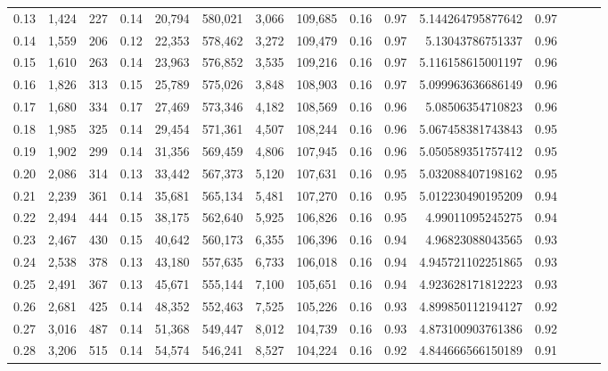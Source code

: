 \begin{tabular}{rrrrrrrrrrrrrrr}
0.13 &   1,424 &    227 &  0.14 &   20,794 &  580,021 &    3,066 &  109,685 &  0.16 &  0.97 &     5.144264795877642 &      0.97 \\
0.14 &   1,559 &    206 &  0.12 &   22,353 &  578,462 &    3,272 &  109,479 &  0.16 &  0.97 &      5.13043786751337 &      0.96 \\
0.15 &   1,610 &    263 &  0.14 &   23,963 &  576,852 &    3,535 &  109,216 &  0.16 &  0.97 &     5.116158615001197 &      0.96 \\
0.16 &   1,826 &    313 &  0.15 &   25,789 &  575,026 &    3,848 &  108,903 &  0.16 &  0.97 &     5.099963636686149 &      0.96 \\
0.17 &   1,680 &    334 &  0.17 &   27,469 &  573,346 &    4,182 &  108,569 &  0.16 &  0.96 &      5.08506354710823 &      0.96 \\
0.18 &   1,985 &    325 &  0.14 &   29,454 &  571,361 &    4,507 &  108,244 &  0.16 &  0.96 &     5.067458381743843 &      0.95 \\
0.19 &   1,902 &    299 &  0.14 &   31,356 &  569,459 &    4,806 &  107,945 &  0.16 &  0.96 &     5.050589351757412 &      0.95 \\
0.20 &   2,086 &    314 &  0.13 &   33,442 &  567,373 &    5,120 &  107,631 &  0.16 &  0.95 &     5.032088407198162 &      0.95 \\
0.21 &   2,239 &    361 &  0.14 &   35,681 &  565,134 &    5,481 &  107,270 &  0.16 &  0.95 &     5.012230490195209 &      0.94 \\
0.22 &   2,494 &    444 &  0.15 &   38,175 &  562,640 &    5,925 &  106,826 &  0.16 &  0.95 &      4.99011095245275 &      0.94 \\
0.23 &   2,467 &    430 &  0.15 &   40,642 &  560,173 &    6,355 &  106,396 &  0.16 &  0.94 &      4.96823088043565 &      0.93 \\
0.24 &   2,538 &    378 &  0.13 &   43,180 &  557,635 &    6,733 &  106,018 &  0.16 &  0.94 &     4.945721102251865 &      0.93 \\
0.25 &   2,491 &    367 &  0.13 &   45,671 &  555,144 &    7,100 &  105,651 &  0.16 &  0.94 &     4.923628171812223 &      0.93 \\
0.26 &   2,681 &    425 &  0.14 &   48,352 &  552,463 &    7,525 &  105,226 &  0.16 &  0.93 &     4.899850112194127 &      0.92 \\
0.27 &   3,016 &    487 &  0.14 &   51,368 &  549,447 &    8,012 &  104,739 &  0.16 &  0.93 &     4.873100903761386 &      0.92 \\
0.28 &   3,206 &    515 &  0.14 &   54,574 &  546,241 &    8,527 &  104,224 &  0.16 &  0.92 &     4.844666566150189 &      0.91 \\

\end{tabular}
